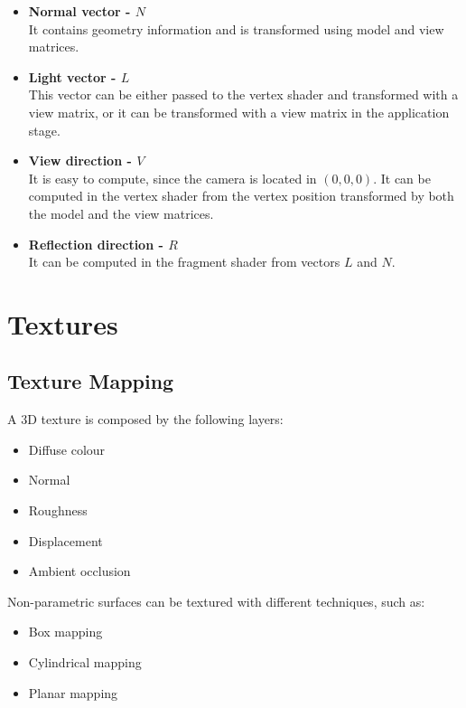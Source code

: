 \documentclass{article}
\begin{document}
\begin{itemize}
	\item \textbf{Normal vector - $N$}
	\vspace{.2cm} \\
	It contains geometry information and is transformed using model and view matrices.
	
	\item \textbf{Light vector - $L$}
	\vspace{.2cm} \\
	This vector can be either passed to the vertex shader and transformed with a view matrix, or it can be transformed with a view matrix in the application stage.
	
	\item \textbf{View direction - $V$}
	\vspace{.2cm} \\
	It is easy to compute, since the camera is located in $(0, 0, 0)$. It can be computed in the vertex shader from the vertex position transformed by both the model and the view matrices.
	
	\item \textbf{Reflection direction - $R$}
	\vspace{.2cm} \\
	It can be computed in the fragment shader from vectors $L$ and $N$.
\end{itemize}

\section{Textures}
\subsection{Texture Mapping}
A 3D texture is composed by the following layers:

\begin{itemize}
	\item Diffuse colour
	\item Normal
	\item Roughness
	\item Displacement
	\item Ambient occlusion
\end{itemize}
Non-parametric surfaces can be textured with different techniques, such as:

\begin{itemize}
	\item Box mapping
	\item Cylindrical mapping
	\item Planar mapping
\end{itemize}
\end{document}
